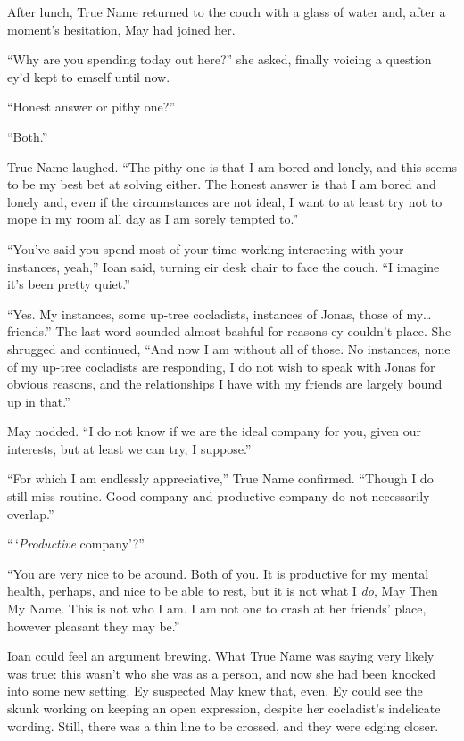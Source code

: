 After lunch, True Name returned to the couch with a glass of water and, after a moment's hesitation, May had joined her.

``Why are you spending today out here?'' she asked, finally voicing a question ey'd kept to emself until now.

``Honest answer or pithy one?''

``Both.''

True Name laughed. ``The pithy one is that I am bored and lonely, and this seems to be my best bet at solving either. The honest answer is that I am bored and lonely and, even if the circumstances are not ideal, I want to at least try not to mope in my room all day as I am sorely tempted to.''

``You've said you spend most of your time working interacting with your instances, yeah,'' Ioan said, turning eir desk chair to face the couch. ``I imagine it's been pretty quiet.''

``Yes. My instances, some up-tree cocladists, instances of Jonas, those of my\ldots friends.'' The last word sounded almost bashful for reasons ey couldn't place. She shrugged and continued, ``And now I am without all of those. No instances, none of my up-tree cocladists are responding, I do not wish to speak with Jonas for obvious reasons, and the relationships I have with my friends are largely bound up in that.''

May nodded. ``I do not know if we are the ideal company for you, given our interests, but at least we can try, I suppose.''

``For which I am endlessly appreciative,'' True Name confirmed. ``Though I do still miss routine. Good company and productive company do not necessarily overlap.''

``\,`\emph{Productive} company'?''

``You are very nice to be around. Both of you. It is productive for my mental health, perhaps, and nice to be able to rest, but it is not what I \emph{do}, May Then My Name. This is not who I am. I am not one to crash at her friends' place, however pleasant they may be.''

Ioan could feel an argument brewing. What True Name was saying very likely was true: this wasn't who she was as a person, and now she had been knocked into some new setting. Ey suspected May knew that, even. Ey could see the skunk working on keeping an open expression, despite her cocladist's indelicate wording. Still, there was a thin line to be crossed, and they were edging closer.

